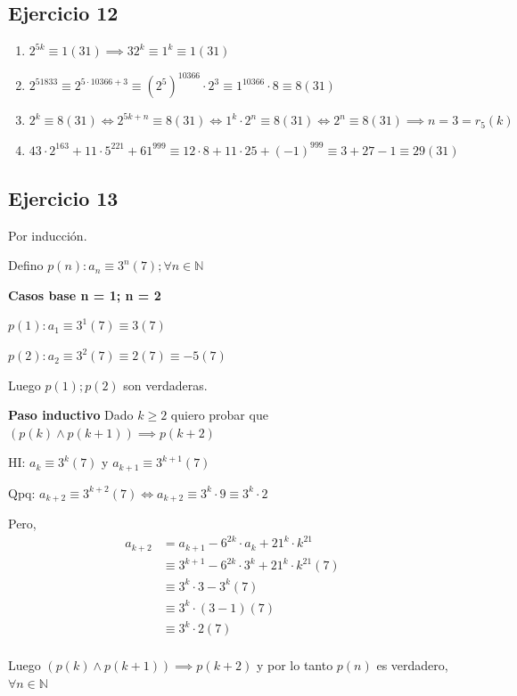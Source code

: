 \subsection{Ejercicio 12}
\begin{enumerate}
    \item $ 2^{5k} \equiv 1(31) \implies 32^k \equiv 1^k \equiv 1(31)$
    \item $ 2^{51833} \equiv 2^{5\cdot 10366 + 3} \equiv (2^5)^{10366} \cdot 2^3 \equiv 1^{10366} \cdot 8 \equiv 8 (31) $
    \item $ 2^k \equiv 8(31) \iff 2^{5k+n} \equiv 8(31) \iff 1^k \cdot 2^n \equiv 8(31) \iff 2^n \equiv 8 (31) \implies n = 3 = r_5(k) $
    \item $ 43 \cdot 2^{163} + 11 \cdot 5^{221} + 61^{999} \equiv 12 \cdot 8 + 11\cdot 25 + (-1)^{999} \equiv 3 + 27 -1 \equiv 29(31)$
\end{enumerate}

\subsection{Ejercicio 13}
Por inducción.

Defino $ p(n): a_n \equiv 3^n(7); \forall n \in \mathbb{N} $

\textbf{Casos base n = 1; n = 2}

$ p(1): a_1 \equiv 3^1(7) \equiv 3(7) $

$ p(2): a_2 \equiv 3^2(7) \equiv 2(7) \equiv -5(7)$

Luego $ p(1); p(2) $ son verdaderas.

\textbf{Paso inductivo}
Dado $ k\geq 2 $ quiero probar que $ (p(k) \wedge p(k+1)) \implies p(k+2) $

HI: $a_k \equiv 3^k(7)$ y $a_{k+1} \equiv 3^{k+1}(7)$

Qpq: $a_{k+2} \equiv 3^{k+2}(7) \iff a_{k+2} \equiv 3^k \cdot 9 \equiv 3^k \cdot 2 $

Pero,
\begin{align*}
    a_{k+2} &= a_{k+1} - 6^{2k} \cdot a_k + 21^k \cdot k^{21} \\ 
    &\equiv 3^{k+1} - 6^{2k} \cdot 3^k + 21^k \cdot k^{21} (7)\\ 
    &\equiv 3^k \cdot 3 - 3^k (7)\\ 
    &\equiv 3^k \cdot (3 - 1) (7)\\ 
    &\equiv 3^k \cdot 2 (7)\\ 
\end{align*}

Luego $ (p(k) \wedge p(k+1)) \implies p(k+2) $ y por lo tanto $ p(n) $ es verdadero, $ \forall n \in \mathbb{N} $

